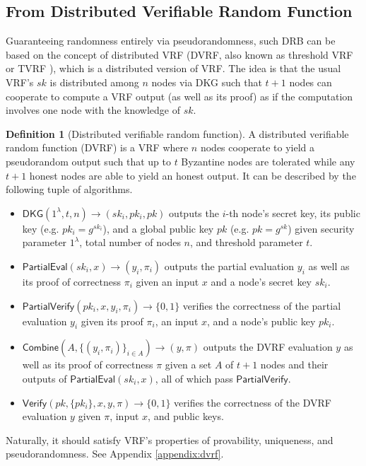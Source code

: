 \documentclass[letterpaper,twocolumn,10pt]{article}
\theoremstyle{definition}
\newtheorem{definition}[theorem]{Definition}
\theoremstyle{remark}
\begin{document}
\subsection{From Distributed Verifiable Random Function}
Guaranteeing randomness entirely via pseudorandomness, such DRB can be based on the concept of distributed VRF \cite{hanke2018dfinity,galindo2020fully} (DVRF, also known as threshold VRF or TVRF \cite{cascudomt}), which is a distributed version of VRF. The idea is that the usual VRF's $sk$ is distributed among $n$ nodes via DKG such that $t + 1$ nodes can cooperate to compute a VRF output (as well as its proof) as if the computation involves one node with the knowledge of $sk$.

\begin{definition}[Distributed verifiable random function]
A distributed verifiable random function (DVRF) is a VRF where $n$ nodes cooperate to yield a pseudorandom output such that up to $t$ Byzantine nodes are tolerated while any $t + 1$ honest nodes are able to yield an honest output. It can be described by the following tuple of algorithms.
\begin{itemize}
\item $\mathsf{DKG}(1^\lambda, t, n) \rightarrow (sk_i, pk_i, pk)$ outputs the $i$-th node's secret key, its public key (e.g. $pk_i = g^{sk_i}$), and a global public key $pk$ (e.g. $pk = g^{sk}$) given security parameter $1^\lambda$, total number of nodes $n$, and threshold parameter $t$.
\item $\mathsf{PartialEval}(sk_i, x) \rightarrow (y_i, \pi_i)$ outputs the partial evaluation $y_i$ as well as its proof of correctness $\pi_i$ given an input $x$ and a node's secret key $sk_i$.
\item $\mathsf{PartialVerify}(pk_i, x, y_i, \pi_i) \rightarrow \{0, 1\}$ verifies the correctness of the partial evaluation $y_i$ given its proof $\pi_i$, an input $x$, and a node's public key $pk_i$.
\item $\mathsf{Combine}(A, \{(y_i, \pi_i)\}_{i \in A}) \rightarrow (y, \pi)$ outputs the DVRF evaluation $y$ as well as its proof of correctness $\pi$ given a set $A$ of $t + 1$ nodes and their outputs of $\mathsf{PartialEval}(sk_i, x)$, all of which pass $\mathsf{PartialVerify}$.
\item $\mathsf{Verify}(pk, \{pk_i\}, x, y, \pi) \rightarrow \{0, 1\}$ verifies the correctness of the DVRF evaluation $y$ given $\pi$, input $x$, and public keys.
\end{itemize}
Naturally, it should satisfy VRF's properties of provability, uniqueness, and pseudorandomness. See Appendix \ref{appendix:dvrf}.
\end{definition}
\end{document}
